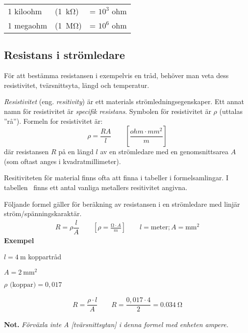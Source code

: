\begin{center}
\begin{tabular}{lll}
  1 kiloohm & (\qty{1}{\kilo\ohm}) & = \(10^3\) ohm \\
  1 megaohm & (\qty{1}{\mega\ohm}) & = \(10^6\) ohm \\
\end{tabular}
\end{center}

\subsection{Resistans i strömledare}

För att bestämma resistansen i exempelvis en tråd, behöver man veta dess 
resistivitet, tvärsnittsyta, längd och temperatur.

\emph{Resistivitet} (eng. \emph{resitivity}) är ett materials
strömledningsegenskaper.
Ett annat namn för resistivitet är \emph{specifik resistans}.
Symbolen för resistivitet är \(\rho\) (uttalas ''rå'').
Formeln for resistivitet är:
\[\rho = \dfrac{R A}{l}\qquad \left[\dfrac{ohm \cdot mm^2}{m}\right]\]
där resistansen \(R\) på en längd \(l\) av en strömledare med en
genomsnittsarea \(A\) (som oftast anges i kvadratmillimeter).

Resitiviteten för material finns ofta att finna i tabeller i formelsamlingar.
I tabellen~ finns ett antal vanliga metallers resitivitet
angivna.

Följande formel gäller för beräkning av resistansen i en strömledare med linjär
ström/spänningskaraktär.
\[\begin{array}{c}
    R = \rho \dfrac{l}{A} \qquad \left[\rho = \frac{\unit{\ohm} \cdot A}{m} \right] \qquad l=\text{meter}; A=\unit{\milli\metre\squared}
\end{array}\]
\noindent
\textbf{Exempel}

\(l = \qty{4}{\metre}\) koppartråd

\(A = \qty{2}{\milli\metre\squared}\)

\(\rho \text{ (koppar)} = 0,017\)

\[\begin{array}{c}
R = \dfrac{\rho \cdot l}{A} \qquad R = \dfrac{0,017 \cdot 4}{2} = \qty{0,034}{\ohm}
\end{array}\]

\noindent
\textbf{Not.} \emph{Förväxla inte A [tvärsnittsytan] i denna formel med enheten ampere.}

